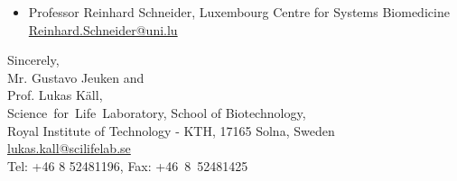 \documentclass[a4paper]{letter}
\begin{document}
\begin{letter}{}
\begin{itemize}
\item Professor Reinhard Schneider,  Luxembourg Centre for Systems Biomedicine \\
\url{Reinhard.Schneider@uni.lu}

\end{itemize}

\vspace*{1.5em}

Sincerely,\\[2em]
Mr. Gustavo Jeuken and\\
Prof. Lukas K\"all, \\
Science~for~Life~Laboratory, School of Biotechnology,\\
Royal Institute of Technology - KTH, 17165 Solna, Sweden\\
\url{lukas.kall@scilifelab.se}\\
Tel: +46 8 52481196, Fax: +46~8~52481425

\end{letter}
\end{document}
